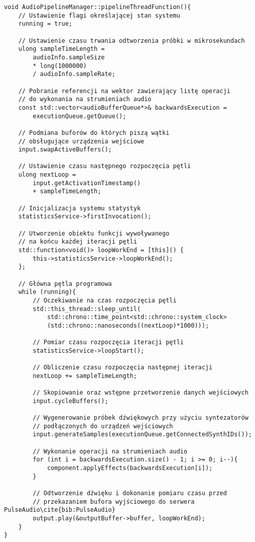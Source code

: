 {}
\begin{lstlisting}
void AudioPipelineManager::pipelineThreadFunction(){
    // Ustawienie flagi określającej stan systemu
    running = true;

    // Ustawienie czasu trwania odtworzenia próbki w mikrosekundach
    ulong sampleTimeLength = 
        audioInfo.sampleSize
        * long(1000000)
        / audioInfo.sampleRate;

    // Pobranie referencji na wektor zawierający listę operacji
    // do wykonania na strumieniach audio
    const std::vector<audioBufferQueue*>& backwardsExecution = 
        executionQueue.getQueue();

    // Podmiana buforów do których piszą wątki
    // obsługujące urządzenia wejściowe
    input.swapActiveBuffers();

    // Ustawienie czasu następnego rozpoczęcia pętli
    ulong nextLoop = 
        input.getActivationTimestamp() 
        + sampleTimeLength;

    // Inicjalizacja systemu statystyk
    statisticsService->firstInvocation();

    // Utworzenie obiektu funkcji wywoływanego
    // na końcu każdej iteracji pętli
    std::function<void()> loopWorkEnd = [this]() { 
        this->statisticsService->loopWorkEnd(); 
    };

    // Główna pętla programowa
    while (running){
        // Oczekiwanie na czas rozpoczęcia pętli
        std::this_thread::sleep_until(
            std::chrono::time_point<std::chrono::system_clock>
            (std::chrono::nanoseconds((nextLoop)*1000)));

        // Pomiar czasu rozpoczęcia iteracji pętli
        statisticsService->loopStart();

        // Obliczenie czasu rozpoczęcia następnej iteracji
        nextLoop += sampleTimeLength;

        // Skopiowanie oraz wstępne przetworzenie danych wejściowych
        input.cycleBuffers();

        // Wygenerowanie próbek dźwiękowych przy użyciu syntezatorów
        // podłączonych do urządzeń wejściowych
        input.generateSamples(executionQueue.getConnectedSynthIDs());

        // Wykonanie operacji na strumieniach audio
        for (int i = backwardsExecution.size() - 1; i >= 0; i--){
            component.applyEffects(backwardsExecution[i]);
        }

        // Odtworzenie dźwięku i dokonanie pomiaru czasu przed
        // przekazaniem bufora wyjściowego do serwera PulseAudio\cite{bib:PulseAudio}
        output.play(&outputBuffer->buffer, loopWorkEnd);
    }
}
\end{lstlisting}


